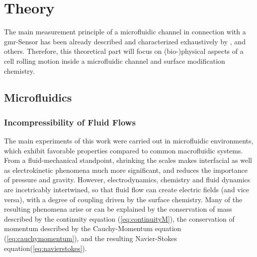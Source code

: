 \setcounter{page}{1}
\chapter{Theory}
The main measurement principle of a microfluidic channel in connection with a \gls{gmr}-Sensor has been already described and characterized exhaustively by \citet{lit:thes:helou}, \citet{lit:thes:reisbeck} and others.\cite{lit:thes:esthi,lit:thes:brenner} Therefore, this theoretical part will focus on (bio-)physical aspects of a cell rolling motion inside a microfluidic channel and surface modification chemistry.

\section{Microfluidics}

\subsection{Incompressibility of Fluid Flows}

\label{sec:theo:incomp}

The main experiments of this work were carried out in microfluidic environments, which exhibit favorable properties compared to common macrofluidic systems. From a fluid-mechanical standpoint, shrinking the scales makes interfacial as well as electrokinetic phenomena much more significant, and reduces the importance of pressure and gravity.\cite{lit:fluidic:kirby} However, electrodynamics, chemistry and fluid dynamics are incetricably intertwined, so that fluid flow can create electric fields (and vice versa), with a degree of coupling driven by the surface chemistry. Many of the resulting phenomena arise or can be explained by the conservation of mass described by the continuity equation (\cref{eq:continuityM}), the conservation of momentum described by the Cauchy-Momentum equation (\cref{eq:cauchymomentum}), and the resulting Navier-Stokes equation(\cref{eq:navierstokes}).

